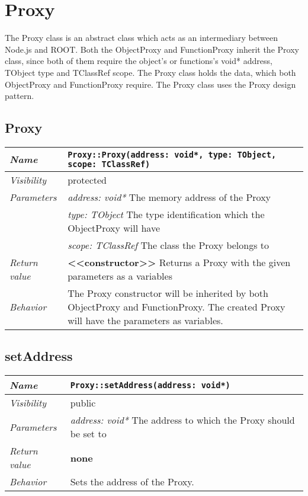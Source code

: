 \chapter{Proxy}
The Proxy class is an abstract class which acts as an intermediary between Node.js and ROOT. Both the ObjectProxy and FunctionProxy inherit the Proxy class, since both of them require the object's or functions's void* address, TObject type and TClassRef scope. The Proxy class holds the data, which both ObjectProxy and FunctionProxy require. The Proxy class uses the Proxy design pattern.
\section{Proxy}
\begin{longtable}{p{3cm} @{\hskip 1cm} p{12cm}}
 \hline
\textit{Name} & \texttt{Proxy::Proxy(address: void*, type: TObject, scope: TClassRef)}\\
\hline
 \textit{Visibility} & protected\\
\hline
\textit{Parameters} & \textit{address: void*} The memory address of the Proxy \\
& \textit{type: TObject}  The type identification which the ObjectProxy will have \\
& \textit{scope: TClassRef} The class the Proxy belongs to \\
\hline
\textit{Return value} & \textbf{ <<constructor>>} Returns a Proxy with the given parameters as a variables \\
  \hline
 \textit{Behavior} & The Proxy constructor will be inherited by both ObjectProxy and FunctionProxy.
 The created Proxy will have the parameters as variables. \\
\hline
\end{longtable} \pagebreak
 \section{setAddress}
\begin{longtable}{p{3cm} @{\hskip 1cm} p{12cm}}
 \hline
\textit{Name} & \texttt{Proxy::setAddress(address: void*)}\\
\hline
 \textit{Visibility} & public\\
\hline
\textit{Parameters} & \textit{address: void*} The address to which the Proxy should be set to \\
\hline
\textit{Return value} & \textbf{none}\\
  \hline
 \textit{Behavior} & Sets the address of the Proxy. \\
\hline
\end{longtable} \pagebreak
